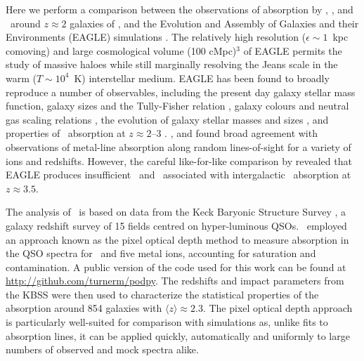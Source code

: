 \documentclass[useAMS,usenatbib,letterpaper]{mn2e}
\def\obspaper{\citetalias{turner14}}
\begin{document}
Here we perform a comparison between
the observations of absorption by \hone, \cfour, and \sifour\ around $z\approx2$ galaxies
of \citet[][hereafter \obspaper]{turner14}, and the
Evolution and Assembly of Galaxies
and their Environments (EAGLE) simulations \citep{schaye15, crain15}.
The relatively high resolution ($\epsilon \sim 1$~kpc comoving) and large cosmological volume 
(100 cMpc)$^3$ of EAGLE permits the study of massive haloes 
while still marginally resolving the Jeans scale in the warm ($T\sim10^4$~K) interstellar medium.
EAGLE has been found to broadly reproduce a number of observables,
including the present day galaxy stellar mass function, 
galaxy sizes and the Tully-Fisher relation \citep{schaye15}, 
galaxy colours \citep{trayford15} and neutral gas scaling relations \citep{bahe16, crain17},
the evolution of galaxy stellar masses \citep{furlong15} and sizes \citep{furlong16},
and properties of \hone\ absorption at $z\approx2$--$3$ \citep{rahmati15}.
\citet{schaye15}, \citet{rahmati16} and \citet{turner16} found broad
agreement with observations of metal-line absorption along random
lines-of-sight for a variety of ions and redshifts. However, the careful like-for-like
comparison by \citet{turner16} revealed that EAGLE produces insufficient 
\cfour\ and \sifour\ associated with intergalactic \hone\ absorption at $z\approx3.5$. 

The analysis of \obspaper\ is based on data from 
the Keck Baryonic Structure Survey \citep[][KBSS]{rudie12, steidel14},
a galaxy redshift survey of 15 fields centred on hyper-luminous QSOs.
\obspaper\ employed an approach known as the pixel optical depth method
\citep{cowie98, ellison00, schaye00a, aguirre02, schaye03}
to measure absorption in the QSO spectra for \hone\ and five metal ions, 
accounting for saturation and contamination. 
A public version of the code used for this work can be found at 
\url{http://github.com/turnerm/podpy}.
The redshifts and impact parameters from the KBSS 
were then used
to characterize the statistical properties of the absorption
around 854  galaxies with $\langle z \rangle \approx 2.3$. 
The pixel optical depth
approach is particularly well-suited for comparison with simulations
as, unlike fits to absorption lines, it can be applied quickly, automatically and uniformly
to large numbers of observed and mock spectra alike. 
\end{document}
